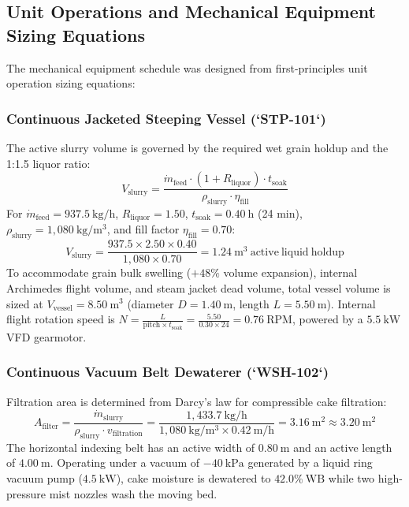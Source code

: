 \documentclass[10pt,a4paper]{article}
\begin{document}
\subsection{Unit Operations and Mechanical Equipment Sizing Equations}
The mechanical equipment schedule was designed from first-principles unit operation sizing equations:

\subsubsection{Continuous Jacketed Steeping Vessel (`STP-101`)}
The active slurry volume is governed by the required wet grain holdup and the 1:1.5 liquor ratio:
\begin{equation}
V_{\mathrm{slurry}} = \frac{\dot{m}_{\mathrm{feed}} \cdot (1 + R_{\mathrm{liquor}}) \cdot t_{\mathrm{soak}}}{\rho_{\mathrm{slurry}} \cdot \eta_{\mathrm{fill}}}
\end{equation}
For $\dot{m}_{\mathrm{feed}} = 937.5\ \mathrm{kg/h}$, $R_{\mathrm{liquor}} = 1.50$, $t_{\mathrm{soak}} = 0.40\ \mathrm{h}$ (24 min), $\rho_{\mathrm{slurry}} = 1,080\ \mathrm{kg/m^3}$, and fill factor $\eta_{\mathrm{fill}} = 0.70$:
\begin{equation}
V_{\mathrm{slurry}} = \frac{937.5 \times 2.50 \times 0.40}{1,080 \times 0.70} = 1.24\ \mathrm{m^3\ active\ liquid\ holdup}
\end{equation}
To accommodate grain bulk swelling ($+48\%$ volume expansion), internal Archimedes flight volume, and steam jacket dead volume, total vessel volume is sized at \textbf{$V_{\mathrm{vessel}} = 8.50\ \mathrm{m}^3$} (diameter $D = 1.40\ \mathrm{m}$, length $L = 5.50\ \mathrm{m}$). Internal flight rotation speed is $N = \frac{L}{\text{pitch} \times t_{\mathrm{soak}}} = \frac{5.50}{0.30 \times 24} = 0.76\ \mathrm{RPM}$, powered by a $5.5\ \mathrm{kW}$ VFD gearmotor.

\subsubsection{Continuous Vacuum Belt Dewaterer (`WSH-102`)}
Filtration area is determined from Darcy's law for compressible cake filtration:
\begin{equation}
A_{\mathrm{filter}} = \frac{\dot{m}_{\mathrm{slurry}}}{\rho_{\mathrm{slurry}} \cdot v_{\mathrm{filtration}}} = \frac{1,433.7\ \mathrm{kg/h}}{1,080\ \mathrm{kg/m^3} \times 0.42\ \mathrm{m/h}} = 3.16\ \mathrm{m^2} \approx \mathbf{3.20\ \mathrm{m^2}}
\end{equation}
The horizontal indexing belt has an active width of $0.80\ \mathrm{m}$ and an active length of $4.00\ \mathrm{m}$. Operating under a vacuum of $-40\ \mathrm{kPa}$ generated by a liquid ring vacuum pump ($4.5\ \mathrm{kW}$), cake moisture is dewatered to $42.0\%\ \mathrm{WB}$ while two high-pressure mist nozzles wash the moving bed.
\end{document}
